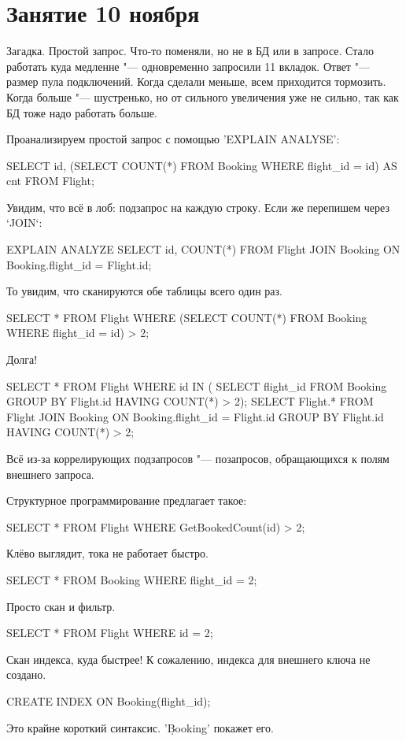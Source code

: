 \chapter{Занятие 10 ноября}

Загадка. Простой запрос. Что-то поменяли, но не в БД или в запросе. Стало работать куда медленне "--- одновременно запросили 11 вкладок.
Ответ "--- размер пула подключений.
Когда сделали меньше, всем приходится тормозить. Когда больше "--- шустренько, но от сильного увеличения уже не сильно, так как БД тоже надо работать больше.

Проанализируем простой запрос с помощью \sql'EXPLAIN ANALYSE':
\begin{sqlcode}
SELECT
	id, (SELECT COUNT(*) FROM Booking WHERE flight_id = id) AS cnt
	FROM Flight;
\end{sqlcode}
Увидим, что всё в лоб: подзапрос на каждую строку.
Если же перепишем через `JOIN`:
\begin{sqlcode}
EXPLAIN ANALYZE SELECT
	id, COUNT(*)
	FROM Flight
	JOIN Booking ON Booking.flight_id = Flight.id;
\end{sqlcode}
То увидим, что сканируются обе таблицы всего один раз.

\begin{sqlcode}
SELECT *
	FROM Flight
	WHERE (SELECT COUNT(*) FROM Booking WHERE flight_id = id) > 2;
\end{sqlcode}
Долга!
\begin{sqlcode}
SELECT *
	FROM Flight
	WHERE id IN (
		SELECT flight_id
		FROM Booking
		GROUP BY Flight.id
		HAVING COUNT(*) > 2);
SELECT Flight.*
	FROM Flight
	JOIN Booking ON Booking.flight_id = Flight.id
	GROUP BY Flight.id
	HAVING COUNT(*) > 2;
\end{sqlcode}
Всё из-за коррелирующих подзапросов "--- позапросов, обращающихся к полям внешнего запроса.

Структурное программирование предлагает такое:
\begin{sqlcode}
SELECT *
	FROM Flight
	WHERE GetBookedCount(id) > 2;
\end{sqlcode}
Клёво выглядит, тока не работает быстро.

\begin{sqlcode}
SELECT *
	FROM Booking
	WHERE flight_id = 2;
\end{sqlcode}
Просто скан и фильтр.
\begin{sqlcode}
SELECT *
	FROM Flight
	WHERE id = 2;
\end{sqlcode}
Скан индекса, куда быстрее!
К сожалению, индекса для внешнего ключа не создано.
\begin{sqlcode}
CREATE INDEX ON Booking(flight_id);
\end{sqlcode}
Это крайне короткий синтаксис. \sql'\d Booking' покажет его.

